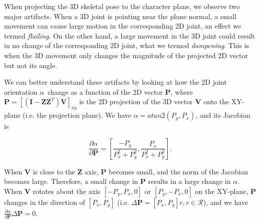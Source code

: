 When projecting the 3D skeletal pose to the character plane, we observe two major artifacts. When a 3D joint is pointing near the plane normal, a small movement can cause large motion in the corresponding 2D joint, an effect we termed \textit{flailing}. On the other hand, a large movement in the 3D joint could result in no change of the corresponding 2D joint, what we termed \textit{dampening}. This is when the 3D movement only changes the magnitude of the projected 2D vector but not its angle.


We can better understand these artifacts by looking at how the 2D joint orientation \(\alpha\)\ change as a function of the 2D vector $\mathbf{P}$, where $\mathbf{P} = [(\mathbf{I} - \mathbf{Z}\mathbf{Z}^{T})\mathbf{V}]_{xy}$ is the 2D projection of the 3D vector $\mathbf{V}$ onto the XY-plane (i.e. the projection plane). We have $\alpha = atan2(P_{y}, P_{x})$, and its Jacobian is

$$
\frac{\partial \alpha}{\partial \mathbf{P}}
=
\left[ 
    \frac{-P_y}{P_x^2 + P_y^2}, 
    \frac{P_x}{P_x^2 + P_y^2}
\right].
$$

When $\mathbf{V}$ is close to the $\mathbf{Z}$ axis, $\mathbf{P}$ becomes small, and the norm of the Jacobian becomes large. Therefore, a small change in $\mathbf{P}$ results in a large change in $\alpha$. When $\mathbf{V}$ rotates about the axis $[-P_y, P_x, 0]$ or $[P_y, -P_x, 0]$ on the XY-plane, $\mathbf{P}$ changes in the direction of $[P_x, P_y]$ (i.e. $\Delta \mathbf{P} = [P_x, P_y]r, r \in \mathcal{R}$), and we have $\frac{\partial \alpha}{\partial \mathbf{P}} \Delta \mathbf{P} = 0$.

